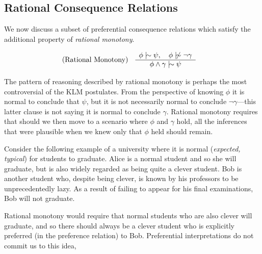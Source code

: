 \subsection{Rational Consequence Relations}
\label{subseciton:rational-consequence-relations}

We now discuss a subset of preferential consequence relations which satisfy the additional property of \textit{rational
monotony}.

\begin{align}
	\inferLeft{Rational Monotony}{\phi \twiddle \psi, \quad \phi \ntwiddle \neg \gamma}{\phi \land \gamma \twiddle \psi}
\end{align}

The pattern of reasoning described by rational monotony is perhaps the most controversial of the KLM postulates. From
the perspective of knowing $\phi$ it is normal to conclude that $\psi$, but it is not necessarily normal to conclude $\neg
\gamma$---this latter clause is not saying it is normal to conclude $\gamma$. Rational monotony requires that should we
then move to a scenario where $\phi$ and $\gamma$ hold, all the inferences that were plausible when we knew only that $\phi$
held should remain.

Consider the following example of a university where it is normal (\textit{expected, typical}) for students to graduate.
Alice is a normal student and so she will graduate, but is also widely regarded as being quite a clever student. Bob is another
student who, despite being clever, is known by his professors to be unprecedentedly lazy. As a result of failing to
appear for his final examinations, Bob will not graduate.

Rational monotony would require that normal students who are also clever will graduate, and so there should always be a
clever student who is explicitly preferred (in the preference relation) to Bob. Preferential interpretations do not commit
us to this idea,

